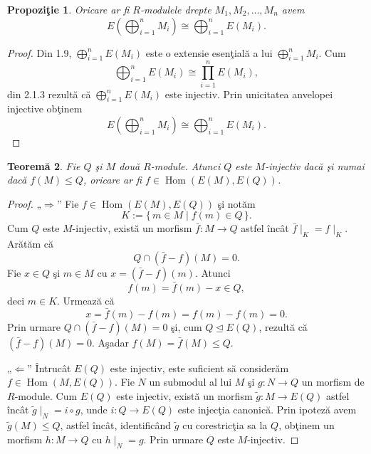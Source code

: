 \documentclass[12pt,a4paper]{book}
\DeclareMathOperator{\Hom}{Hom}
\newcommand{\ess}{\trianglelefteq}  %
\theoremstyle{plain}
\newtheorem{theorem}{Teoremă}[section] %
\newtheorem{proposition}[theorem]{Propoziţie}
\theoremstyle{definition}
\theoremstyle{remark}
\begin{document}
\begin{proposition}
Oricare ar fi $R$-modulele drepte $M_1,M_2,\dots,M_n$ avem
\[
E\!\left(\bigoplus_{i=1}^{n} M_i\right)
  \cong \bigoplus_{i=1}^{n} E(M_i).
\]
\end{proposition}

\begin{proof}
Din 1.9, $\bigoplus_{i=1}^{n} E(M_i)$ este o extensie esenţială
a lui $\bigoplus_{i=1}^{n} M_i$.
Cum
\[
\bigoplus_{i=1}^{n} E(M_i) \cong \prod_{i=1}^{n} E(M_i),
\]
din 2.1.3 rezultă că $\bigoplus_{i=1}^{n} E(M_i)$ este injectiv.
Prin unicitatea anvelopei injective obţinem
\[
E\!\left(\bigoplus_{i=1}^{n} M_i\right)
  \cong \bigoplus_{i=1}^{n} E(M_i).
\]
\end{proof}





\begin{theorem}
Fie \(Q\) şi \(M\) două \(R\)-module. Atunci \(Q\) este \(M\)-injectiv dacă şi numai dacă
\(f(M) \leq Q\), oricare ar fi \(f \in \Hom(E(M),E(Q))\).
\end{theorem}

\begin{proof}
„\(\Rightarrow\)” Fie \(f \in \Hom(E(M),E(Q))\) şi notăm
\[
K := \{\,m \in M \mid f(m) \in Q\,\}.
\]
Cum \(Q\) este \(M\)-injectiv, există un morfism \(\bar{f} : M \to Q\) astfel încât
\(\bar{f}\!\mid_{K} = f\!\mid_{K}\).
Arătăm că
\[
Q \cap (\bar{f}-f)(M) = 0.
\]
Fie \(x \in Q\) şi \(m \in M\) cu \(x = (\bar{f}-f)(m)\).
Atunci
\[
f(m) = \bar{f}(m) - x \in Q,
\]
deci \(m \in K\).
Urmează că
\[
x = \bar{f}(m) - f(m) = f(m) - f(m) = 0.
\]
Prin urmare \(Q \cap (\bar{f}-f)(M) = 0\) şi, cum \(Q \ess E(Q)\), rezultă că
\((\bar{f}-f)(M) = 0\).
Aşadar \(f(M) = \bar{f}(M) \leq Q\).

„\(\Leftarrow\)” Întrucât \(E(Q)\) este injectiv, este suficient să considerăm
\(f \in \Hom(M,E(Q))\).
Fie \(N\) un submodul al lui \(M\) şi \(g : N \to Q\) un morfism de \(R\)-module.
Cum \(E(Q)\) este injectiv, există un morfism \(\tilde{g} : M \to E(Q)\) astfel încât
\(\tilde{g}\!\mid_{N} = i \circ g\), unde \(i : Q \to E(Q)\) este injecţia canonică.
Prin ipoteză avem \(\tilde{g}(M) \leq Q\), astfel încât, identificând \(\tilde{g}\) cu
corestricţia sa la \(Q\), obţinem un morfism \(h : M \to Q\) cu
\(h\!\mid_{N} = g\).
Prin urmare \(Q\) este \(M\)-injectiv.
\end{proof}


\end{document}
